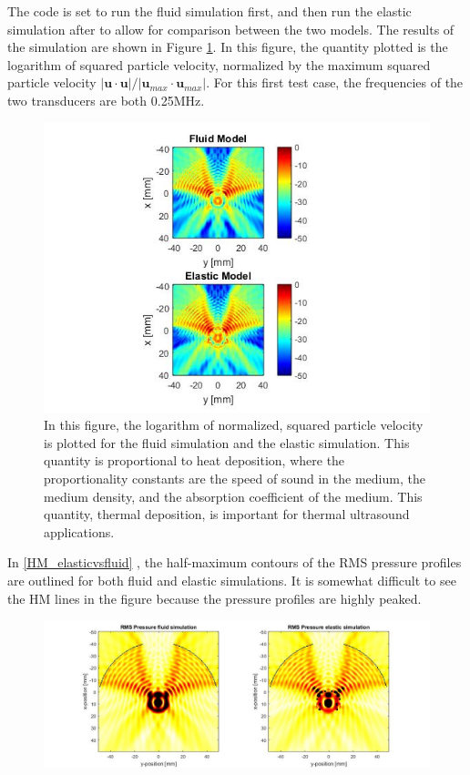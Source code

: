 \documentclass[10pt,a4paper]{article}
\begin{document}
The code is set to run the fluid simulation first, and then run the elastic simulation after to allow for comparison between the two models. The results of the simulation are shown in Figure \ref{elasticvsfluid_heatmap}. In this figure, the quantity plotted is the logarithm of squared particle velocity, normalized by the maximum squared particle velocity $\vert \textbf{u} \cdot \textbf{u} \vert / \vert  \textbf{u}_{max} \cdot \textbf{u}_{max}\vert $. For this first test case, the frequencies of the two transducers are both 0.25MHz. 

\begin{figure}[H]
\centering
\includegraphics[scale=0.7]{circle_elasticvsfluid_heatmap}
\caption{In this figure, the logarithm of normalized, squared particle velocity is plotted for the fluid simulation and the elastic simulation. This quantity is proportional to heat deposition, where the proportionality constants are the speed of sound in the medium, the medium density, and the absorption coefficient of the medium. This quantity, thermal deposition, is important for thermal ultrasound applications.}\label{elasticvsfluid_heatmap}
\end{figure}

In \autoref{HM_elasticvsfluid} , the half-maximum contours of the RMS pressure profiles are outlined for both fluid and elastic simulations. It is somewhat difficult to see the HM lines in the figure because the pressure profiles are highly peaked. 

\begin{figure}[H]
\hspace*{-4cm}                                                    
\includegraphics[scale=0.5]{FWHM_elasticvsfluid}
\label{HM_elasticvsfluid}
\end{figure}
\end{document}
